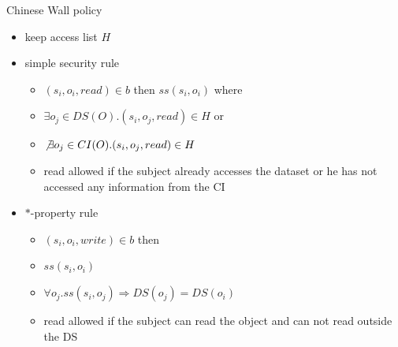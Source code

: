 \documentclass{beamer}
\begin{document}
\begin{frame}{Chinese Wall policy}
  \begin{itemize}
    \item keep access list $H$
    \item simple security rule
      \begin{itemize}
        \item $(s_i, o_i, read) \in b$ then $ss(s_i,o_i)$ where
        \item $\exists o_j \in DS(O). (s_i, o_j, read) \in H$ or
        \item $\not \exists o_j \in CI(O). (s_i, o_j, read) \in H$
        \item read allowed if the subject already accesses the dataset
          or he has not accessed any information from the CI
      \end{itemize}
    \item $*$-property rule
      \begin{itemize}
        \item $(s_i, o_i, write) \in b$ then
        \item $ss(s_i,o_i)$
        \item $\forall o_j.ss(s_i,o_j) \Rightarrow DS(o_j) = DS(o_i)$
        \item read allowed if the subject can read the object and can
          not read outside the DS
      \end{itemize}
  \end{itemize}
\end{frame}
\end{document}
